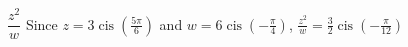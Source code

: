 { $\dfrac{z^{2}}{w}$ }
{ Since $z = 3\operatorname{cis}\left(\frac{5\pi}{6}\right)$ and $w = 6\operatorname{cis}\left(-\frac{\pi}{4}\right)$,  $\frac{z^2}{w} =\frac{3}{2}\operatorname{cis}\left(-\frac{\pi}{12}\right)$}
